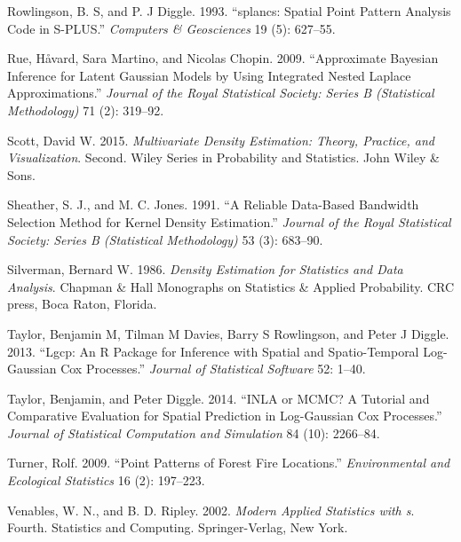 \begin{CSLReferences}{1}{0}
\leavevmode{}%
Rowlingson, B. S, and P. J Diggle. 1993. {``{splancs}: Spatial Point Pattern Analysis Code in {S-PLUS}.''} \emph{Computers \& Geosciences} 19 (5): 627--55.

\leavevmode{}%
Rue, Håvard, Sara Martino, and Nicolas Chopin. 2009. {``Approximate Bayesian Inference for Latent {G}aussian Models by Using Integrated Nested {L}aplace Approximations.''} \emph{Journal of the Royal Statistical Society: Series B (Statistical Methodology)} 71 (2): 319--92.

\leavevmode{}%
Scott, David W. 2015. \emph{Multivariate Density Estimation: Theory, Practice, and Visualization}. Second. Wiley Series in Probability and Statistics. John Wiley \& Sons.

\leavevmode{}%
Sheather, S. J., and M. C. Jones. 1991. {``A Reliable Data-Based Bandwidth Selection Method for Kernel Density Estimation.''} \emph{Journal of the Royal Statistical Society: Series B (Statistical Methodology)} 53 (3): 683--90.

\leavevmode{}%
Silverman, Bernard W. 1986. \emph{Density Estimation for Statistics and Data Analysis}. Chapman \& Hall Monographs on Statistics \& Applied Probability. CRC press, Boca Raton, Florida.

\leavevmode{}%
Taylor, Benjamin M, Tilman M Davies, Barry S Rowlingson, and Peter J Diggle. 2013. {``Lgcp: An {R} Package for Inference with Spatial and Spatio-Temporal Log-{G}aussian {C}ox Processes.''} \emph{Journal of Statistical Software} 52: 1--40.

\leavevmode{}%
Taylor, Benjamin, and Peter Diggle. 2014. {``{INLA} or {MCMC}? A Tutorial and Comparative Evaluation for Spatial Prediction in Log-{G}aussian {C}ox Processes.''} \emph{Journal of Statistical Computation and Simulation} 84 (10): 2266--84.

\leavevmode{}%
Turner, Rolf. 2009. {``Point Patterns of Forest Fire Locations.''} \emph{Environmental and Ecological Statistics} 16 (2): 197--223.

\leavevmode{}%
Venables, W. N., and B. D. Ripley. 2002. \emph{Modern Applied Statistics with s}. Fourth. Statistics and Computing. Springer-Verlag, New York.


\end{CSLReferences}
